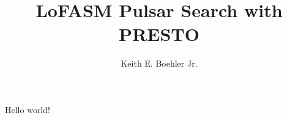 \documentclass{article}
\title{LoFASM Pulsar Search with PRESTO}
\author{Keith E. Boehler Jr.}
\date{}
\begin{document}
   \maketitle
   Hello world!
\end{document}
